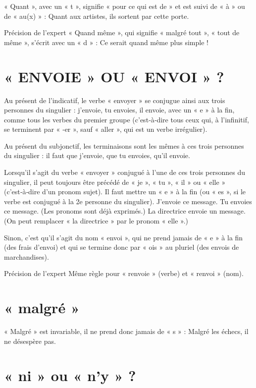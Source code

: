« Quant », avec un « t », signifie « pour ce qui est de » et est suivi de « à » ou de « au(x) » : Quant aux artistes, ils sortent par cette porte.

Précision de l'expert
« Quand même », qui signifie « malgré tout », « tout de même », s'écrit avec un « d » : Ce serait quand même plus simple !

\section{« ENVOIE » OU « ENVOI » ?}

Au présent de l'indicatif, le verbe « envoyer » se conjugue ainsi aux trois personnes du singulier : j'envoie, tu envoies, il envoie, avec un « e » à la fin, comme tous les verbes du premier groupe (c'est‑à‑dire tous ceux qui, à l'infinitif, se terminent par « ‑er », sauf « aller », qui est un verbe irrégulier).

Au présent du subjonctif, les terminaisons sont les mêmes à ces trois personnes du singulier : il faut que j'envoie, que tu envoies, qu'il envoie.

Lorsqu'il s'agit du verbe « envoyer » conjugué à l'une de ces trois personnes du singulier, il peut toujours être précédé de « je », « tu », « il » ou « elle » (c'est‑à‑dire d'un pronom sujet). Il faut mettre un « e » à la fin (ou « es », si le verbe est conjugué à la 2e personne du singulier).
J'envoie ce message. Tu envoies ce message. (Les pronoms sont déjà exprimés.)
La directrice envoie un message. (On peut remplacer « la directrice » par le pronom « elle ».)

Sinon, c'est qu'il s'agit du nom « envoi », qui ne prend jamais de « e » à la fin (des frais d'envoi) et qui se termine donc par « ois » au pluriel (des envois de marchandises).

Précision de l'expert
Même règle pour « renvoie » (verbe) et « renvoi » (nom).

\section{« malgré »}


« Malgré » est invariable, il ne prend donc jamais de « s » : Malgré les échecs, il ne désespère pas.

\section{« ni » ou « n'y » ?}

